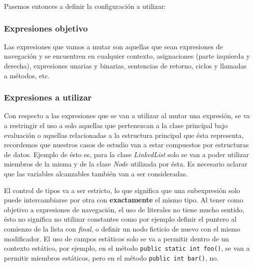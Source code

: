 Pasemos entonces a definir la configuraci\'on a utilizar:

\subsubsection{Expresiones objetivo}

Las expresiones que vamos a mutar son aquellas que sean expresiones de navegaci\'on y se encuentren en cualquier contexto, asignaciones (parte izquierda y derecha), expresiones unarias y binarias, sentencias de retorno, ciclos y llamadas a m\'etodos, etc.

\subsubsection{Expresiones a utilizar}

Con respecto a las expresiones que se van a utilizar al mutar una expresi\'on, se va a restringir el uso a solo aquellas que pertenezcan a la clase principal bajo evaluaci\'on o aquellas relacionadas a la estructura principal que \'esta representa, recordemos que nuestros casos de estudio van a estar compuestos por estructuras de datos. Ejemplo de \'esto es, para la clase \emph{LinkedList} solo se van a poder utilizar miembros de la misma y de la clase \emph{Node} utilizada por \'esta. Es necesario aclarar que las variables alcanzables tambi\'en van a ser consideradas.

El control de tipos va a ser estricto, lo que significa que una subexpresi\'on solo puede intercambiarse por otra con \textbf{exactamente} el mismo tipo. Al tener como objetivo a expresiones de navegaci\'on, el uso de literales no tiene mucho sentido, \'esto no significa no utilizar constantes como por ejemplo definir el puntero al comienzo de la lista con \emph{final}, o definir un nodo ficticio de nuevo con el mismo modificador. El uso de campos est\'aticos solo se va a permitir dentro de un contexto est\'atico, por ejemplo, en el m\'etodo \lstinline|public static int foo()|, se van a permitir miembros est\'aticos, pero en el m\'etodo \lstinline|public int bar()|, no.

